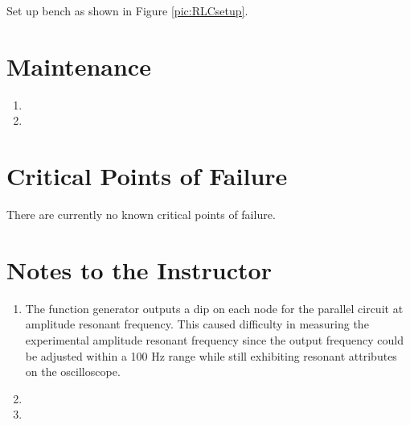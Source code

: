 \documentclass[justified]{tufte-book}
\begin{document}
Set up bench as shown in Figure \ref{pic:RLCsetup}.

\section{Maintenance}

\begin{enumerate}
\item 
\item 
\end{enumerate}

\section{Critical Points of Failure}

There are currently no known critical points of failure.

\section{Notes to the Instructor}
\begin{enumerate}
\item The function generator outputs a dip on each node for the parallel circuit at amplitude resonant frequency. This caused difficulty in measuring the experimental amplitude resonant frequency since the output frequency could be adjusted within a 100 Hz range while still exhibiting resonant attributes on the oscilloscope. 
\item 
\item 
\end{enumerate}
\end{document}
